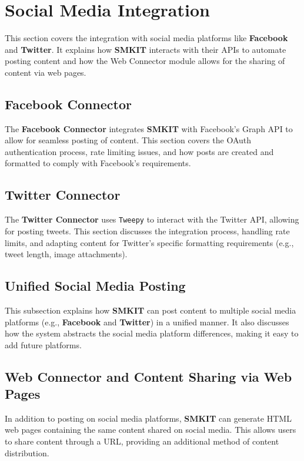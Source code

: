 \section{Social Media Integration}
\label{sec:social_media_integration}
This section covers the integration with social media platforms like \textbf{Facebook} and \textbf{Twitter}. It explains how \textbf{SMKIT} interacts with their APIs to automate posting content and how the Web Connector module allows for the sharing of content via web pages.

\subsection{Facebook Connector}
\label{subsec:facebook_connector}
The \textbf{Facebook Connector} integrates \textbf{SMKIT} with Facebook’s Graph API to allow for seamless posting of content. This section covers the OAuth authentication process, rate limiting issues, and how posts are created and formatted to comply with Facebook's requirements.

\subsection{Twitter Connector}
\label{subsec:twitter_connector}
The \textbf{Twitter Connector} uses \texttt{Tweepy} to interact with the Twitter API, allowing for posting tweets. This section discusses the integration process, handling rate limits, and adapting content for Twitter's specific formatting requirements (e.g., tweet length, image attachments).

\subsection{Unified Social Media Posting}
\label{subsec:unified_social_media_posting}
This subsection explains how \textbf{SMKIT} can post content to multiple social media platforms (e.g., \textbf{Facebook} and \textbf{Twitter}) in a unified manner. It also discusses how the system abstracts the social media platform differences, making it easy to add future platforms.

\subsection{Web Connector and Content Sharing via Web Pages}
\label{subsec:web_connector_content_sharing}
In addition to posting on social media platforms, \textbf{SMKIT} can generate HTML web pages containing the same content shared on social media. This allows users to share content through a URL, providing an additional method of content distribution.

